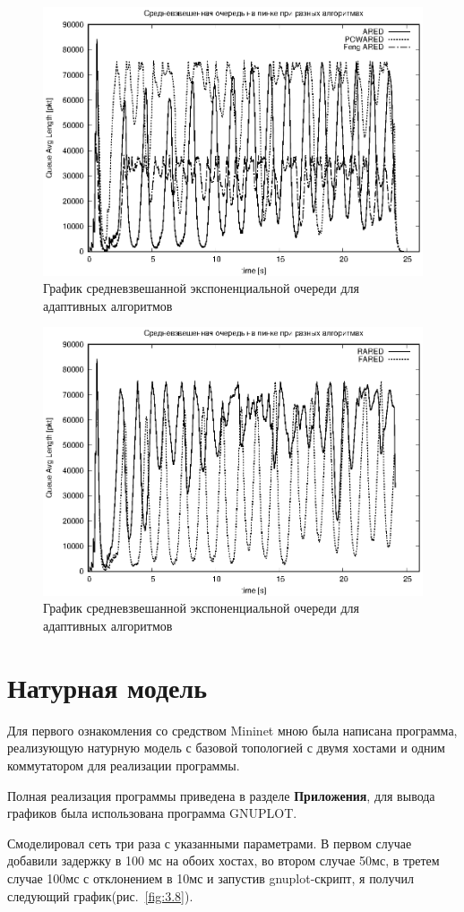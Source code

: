 \begin{figure}[!ht]
  \centering
  \includegraphics[width=0.7\linewidth]{image/av_queues_adaptive2.eps}
  \caption{График средневзвешанной экспоненциальной очереди для адаптивных алгоритмов}
  \label{fig:3.6}
\end{figure}

\begin{figure}[!ht]
  \centering
  \includegraphics[width=0.7\linewidth]{image/av_queues_adaptive3.eps}
  \caption{График средневзвешанной экспоненциальной очереди для адаптивных алгоритмов}
  \label{fig:3.7}
\end{figure}

\section{Натурная модель}

Для первого ознакомления со средством Mininet мною была написана программа, реализующую натурную модель с 
базовой топологией с двумя хостами и одним коммутатором для реализации программы.
 
Полная реализация программы приведена в разделе \textbf{Приложения},
для вывода графиков была использована программа GNUPLOT.

Смоделировал сеть три раза с указанными параметрами. В первом случае добавили задержку в 100 мс на обоих хостах, во втором случае 50мс, в третем случае 100мс с отклонением в 10мс и запустив gnuplot-скрипт, я получил следующий график(рис.~\ref{fig:3.8}).

